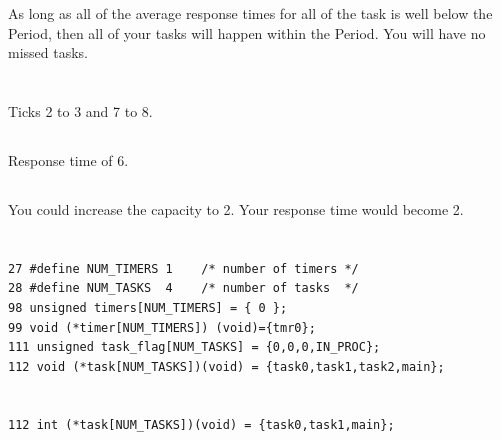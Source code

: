 \documentclass[a4paper,12pt]{article}
\begin{document}
As long as all of the average response times for all of the task is well below the Period, then all of your tasks will happen within the Period.  You will have no missed tasks.

\section{}

\subsection{}
Ticks 2 to 3 and 7 to 8.
\begin{figure}[h!]
\end{figure}

\subsection{}
Response time of 6.

\subsection{}
You could increase the capacity to 2.  Your response time would become 2.

\section{}
\lstset{language=C}
\begin{lstlisting}
27 #define NUM_TIMERS 1    /* number of timers */
28 #define NUM_TASKS  4    /* number of tasks  */
98 unsigned timers[NUM_TIMERS] = { 0 };
99 void (*timer[NUM_TIMERS]) (void)={tmr0};
111 unsigned task_flag[NUM_TASKS] = {0,0,0,IN_PROC};
112 void (*task[NUM_TASKS])(void) = {task0,task1,task2,main};
\end{lstlisting}

\section{}
\lstset{language=C}
\begin{lstlisting}
112 int (*task[NUM_TASKS])(void) = {task0,task1,main};
\end{lstlisting}
\end{document}
